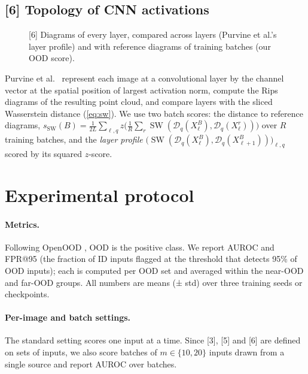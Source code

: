 \documentclass[11pt]{article}
\newcommand{\PD}{\mathcal{D}}
\newcommand{\SW}{\operatorname{SW}}
\begin{document}
\subsection{[6] Topology of CNN activations}
\begin{figure}[h]
\centering
{}
\caption{[6] Diagrams of every layer, compared across layers (Purvine et al.'s layer profile) and
with reference diagrams of training batches (our OOD score).}
\label{fig:sw}
\end{figure}
Purvine et al.\ \citep{purvine2023cnn} represent each image at a convolutional layer by the channel
vector at the spatial position of largest activation norm, compute the Rips diagrams of the
resulting point cloud, and compare layers with the sliced Wasserstein distance (\cref{eq:sw}).
We use two batch scores: the distance to reference diagrams,
$s_{\SW}(B)=\frac{1}{2L}\sum_{\ell,q}z\bigl(\frac1R\sum_{r}\SW(\PD_q(X_\ell^{B}),\PD_q(X_\ell^{r}))\bigr)$
over $R$ training batches, and the \emph{layer profile}
$\bigl(\SW(\PD_q(X_\ell^B),\PD_q(X_{\ell+1}^B))\bigr)_{\ell,q}$ scored by its squared $z$-score.

\section{Experimental protocol}
\label{sec:protocol}
\paragraph{Metrics.} Following OpenOOD \citep{zhang2023openood}, OOD is the positive class. We report
AUROC and FPR@95 (the fraction of ID inputs flagged at the threshold that detects 95\% of OOD
inputs); each is computed per OOD set and averaged within the near-OOD and far-OOD groups. All
numbers are means (± std) over three training seeds or checkpoints.
\paragraph{Per-image and batch settings.} The standard setting scores one input at a time. Since
[3], [5] and [6] are defined on sets of inputs, we also score batches of $m\in\{10,20\}$ inputs
drawn from a single source and report AUROC over batches.
\end{document}
